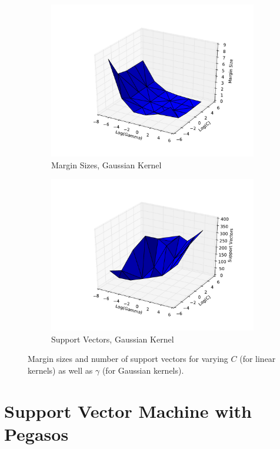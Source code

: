 \documentclass[10pt,psamsfonts]{amsart}
\theoremstyle{definition}
\theoremstyle{remark}
\numberwithin{equation}{section}
\begin{document}
\begin{figure}[b]
\begin{subfigure}[b]{0.23\textwidth}
		\includegraphics[width=\textwidth]{hw2-2_3_gausmargins.pdf}
		\caption{Margin Sizes, Gaussian Kernel}
	\end{subfigure}
	\begin{subfigure}[b]{0.23\textwidth}
		\includegraphics[width=\textwidth]{hw2-2_3_gaussv.pdf}
		\caption{Support Vectors, Gaussian Kernel}
	\end{subfigure}
	\caption{Margin sizes and number of support vectors for varying $C$ (for linear kernels) as well as $\gamma$ (for Gaussian kernels).}
\end{figure}


\section{Support Vector Machine with Pegasos}
\end{document}
